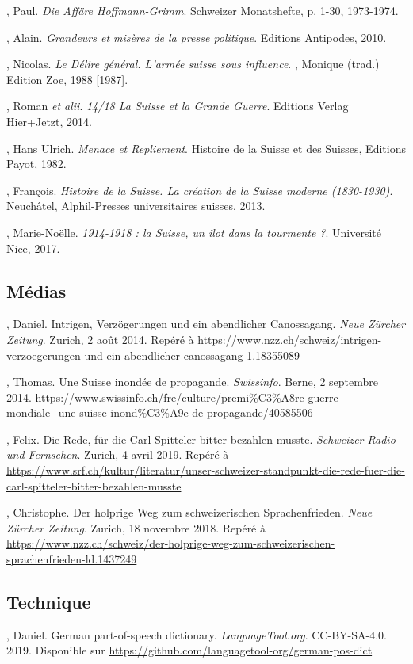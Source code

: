 \documentclass[french,a4paper]{article}
\begin{document}
\begin{thebibliography}{9}
, Paul.
\textit{Die Affäre Hoffmann-Grimm}.
Schweizer Monatshefte, p. 1-30, 1973-1974.

, Alain.
\textit{Grandeurs et misères de la presse politique}.
Editions Antipodes, 2010.

, Nicolas.
\textit{Le Délire général. L’armée suisse sous influence}.
, Monique (trad.)
Edition Zoe, 1988 [1987].

, Roman \textit{et alii}.
\textit{14/18 La Suisse et la Grande Guerre}.
Editions Verlag Hier+Jetzt, 2014.

, Hans Ulrich.
\textit{Menace et Repliement}. 
Histoire de la Suisse et des Suisses, Editions Payot, 1982.
 
, François.
\textit{Histoire de la Suisse. La création de la Suisse moderne (1830-1930)}.
Neuchâtel, Alphil-Presses universitaires suisses, 2013.

, Marie-Noëlle.
\textit{1914-1918 : la Suisse, un îlot dans la tourmente ?}.
Université Nice, 2017.

\subsection*{Médias}

, Daniel.
Intrigen, Verzögerungen und ein abendlicher Canossagang. \textit{Neue Zürcher Zeitung}.
Zurich, 2 août 2014.
Repéré à \url{https://www.nzz.ch/schweiz/intrigen-verzoegerungen-und-ein-abendlicher-canossagang-1.18355089}

, Thomas.
Une Suisse inondée de propagande.
\textit{Swissinfo}. Berne, 2 septembre 2014.
\url{https://www.swissinfo.ch/fre/culture/premi\%C3\%A8re-guerre-mondiale_une-suisse-inond\%C3\%A9e-de-propagande/40585506}

, Felix.
Die Rede, für die Carl Spitteler bitter bezahlen musste. \textit{Schweizer Radio und Fernsehen}.
Zurich, 4 avril 2019.
Repéré à \url{https://www.srf.ch/kultur/literatur/unser-schweizer-standpunkt-die-rede-fuer-die-carl-spitteler-bitter-bezahlen-musste}

, Christophe.
Der holprige Weg zum schweizerischen Sprachenfrieden. \textit{Neue Zürcher Zeitung}.
Zurich, 18 novembre 2018.
Repéré à \url{https://www.nzz.ch/schweiz/der-holprige-weg-zum-schweizerischen-sprachenfrieden-ld.1437249}

\subsection*{Technique}

, Daniel.
German part-of-speech dictionary. \textit{LanguageTool.org}.
CC-BY-SA-4.0. 2019.
Disponible sur \url{https://github.com/languagetool-org/german-pos-dict}

\end{thebibliography}
\end{document}
